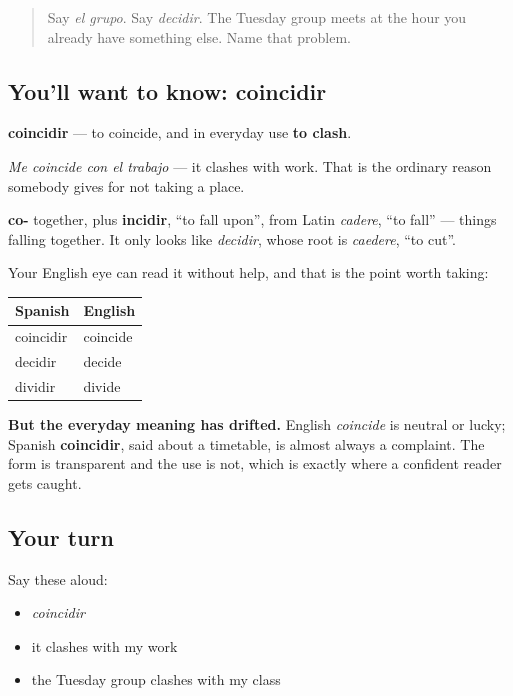 \begin{quote}
Say \emph{el grupo}. Say \emph{decidir}. The Tuesday group meets at the hour you already have something else. Name that problem.
\end{quote}

\subsection*{You'll want to know: coincidir}
\textbf{coincidir} — to coincide, and in everyday use \textbf{to clash}.

\emph{Me coincide con el trabajo} — it clashes with work. That is the ordinary reason somebody gives for not taking a place.

\begin{cousinweb}
\textbf{co-} together, plus \textbf{incidir}, \textquotedblleft{}to fall upon\textquotedblright{}, from Latin \emph{cadere}, \textquotedblleft{}to fall\textquotedblright{} — things falling together. It only looks like \emph{decidir}, whose root is \emph{caedere}, \textquotedblleft{}to cut\textquotedblright{}.

Your English eye can read it without help, and that is the point worth taking:

\noindent
\begin{tabularx}{\linewidth}{@{}>{\raggedright\arraybackslash}X>{\raggedright\arraybackslash}X@{}}
\toprule
\textbf{Spanish} & \textbf{English} \\
\midrule
coincidir & coincide \\
decidir & decide \\
dividir & divide \\
\bottomrule
\end{tabularx}

\textbf{But the everyday meaning has drifted.} English \emph{coincide} is neutral or lucky; Spanish \textbf{coincidir}, said about a timetable, is almost always a complaint. The form is transparent and the use is not, which is exactly where a confident reader gets caught.
\end{cousinweb}

\subsection*{Your turn}
Say these aloud:

\begin{itemize}
\raggedright
  \item \emph{coincidir}
  \item it clashes with my work
  \item the Tuesday group clashes with my class
\end{itemize}


